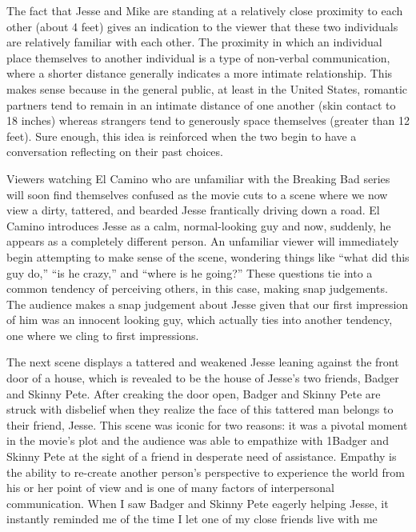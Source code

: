 \documentclass[12pt]{article}
\begin{document}
\par
The fact that Jesse and Mike are standing at a relatively close proximity to each
other (about 4 feet) gives an indication to the viewer that these two individuals
are relatively familiar with each other. The proximity in which an individual
place themselves to another individual is a type of non-verbal communication,
where a shorter distance generally indicates a more intimate relationship. This
makes sense because in the general public, at least in the United States, romantic
partners tend to remain in an intimate distance of one another (skin contact
to 18 inches) whereas strangers tend to generously space themselves (greater
than 12 feet). Sure enough, this idea is reinforced when the two begin to have a
conversation reflecting on their past choices.
\par
Viewers watching El Camino who are unfamiliar with the Breaking Bad series
will soon find themselves confused as the movie cuts to a scene where we now
view a dirty, tattered, and bearded Jesse frantically driving down a road. El
Camino introduces Jesse as a calm, normal-looking guy and now, suddenly, he
appears as a completely different person. An unfamiliar viewer will immediately
begin attempting to make sense of the scene, wondering things like “what did
this guy do,” “is he crazy,” and “where is he going?” These questions tie into a
common tendency of perceiving others, in this case, making snap judgements.
The audience makes a snap judgement about Jesse given that our first impression
of him was an innocent looking guy, which actually ties into another tendency,
one where we cling to first impressions.
\par
The next scene displays a tattered and weakened Jesse leaning against the
front door of a house, which is revealed to be the house of Jesse’s two friends,
Badger and Skinny Pete. After creaking the door open, Badger and Skinny
Pete are struck with disbelief when they realize the face of this tattered man
belongs to their friend, Jesse. This scene was iconic for two reasons: it was a
pivotal moment in the movie’s plot and the audience was able to empathize with
1Badger and Skinny Pete at the sight of a friend in desperate need of assistance.
Empathy is the ability to re-create another person’s perspective to experience the
world from his or her point of view and is one of many factors of interpersonal
communication. When I saw Badger and Skinny Pete eagerly helping Jesse, it
instantly reminded me of the time I let one of my close friends live with me
\end{document}
